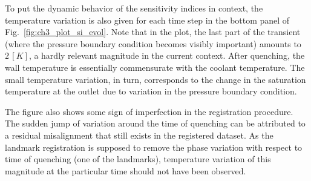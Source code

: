 To put the dynamic behavior of the sensitivity indices in context, the temperature variation is also given for each time step in the bottom panel of Fig.~\ref{fig:ch3_plot_si_evol}.
Note that in the plot, the last part of the transient (where the pressure boundary condition becomes visibly important) amounts to $2\,[K]$, a hardly relevant magnitude in the current context.
After quenching, the wall temperature is essentially commensurate with the coolant temperature.
The small temperature variation, in turn, corresponds to the change in the saturation temperature at the outlet due to variation in the pressure boundary condition.

The figure also shows some sign of imperfection in the registration procedure.
The sudden jump of variation around the time of quenching can be attributed to a residual misalignment that still exists in the registered dataset.
As the landmark registration is supposed to remove the phase variation with respect to time of quenching (one of the landmarks),
temperature variation of this magnitude at the particular time should not have been observed.